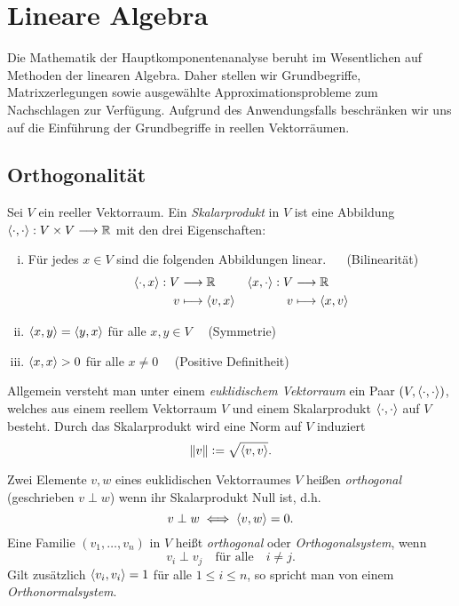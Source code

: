 \chapter{Lineare Algebra}
\label{linear_algebra}

Die Mathematik der Hauptkomponentenanalyse beruht im Wesentlichen auf Methoden der linearen Algebra. Daher stellen wir Grundbegriffe, Matrixzerlegungen sowie ausgewählte Approximationsprobleme zum Nachschlagen zur Verfügung. Aufgrund des Anwendungsfalls beschränken wir uns auf die Einführung der Grundbegriffe in reellen Vektorräumen.

\section{Orthogonalität}
\label{orthogonality}

\begin{defn}
Sei $V$ ein reeller Vektorraum. Ein \textit{Skalarprodukt} in $V$ ist eine Abbildung $\langle \cdot, \cdot \rangle: V \times V \longrightarrow \mathbb{R}$ mit den drei Eigenschaften:
\begin{enumerate}[(i)]
\item Für jedes $x \in V$ sind die folgenden Abbildungen linear. $\quad$ (Bilinearität)
\begin{align*}
\langle \cdot, x \rangle: V & \longrightarrow \mathbb{R} & \langle x, \cdot \rangle: V & \longrightarrow \mathbb{R}\\
v & \longmapsto \langle v, x \rangle & v & \longmapsto \langle x, v \rangle
\end{align*}
\item \vspace{-0.3cm}$\langle x, y \rangle = \langle y, x \rangle$ für alle  $x,y \in V \quad$ (Symmetrie)
\item $\langle x, x \rangle > 0$ für alle $x \neq 0 \quad$ (Positive Definitheit)
\end{enumerate}
\end{defn}

Allgemein versteht man unter einem \textit{euklidischem Vektorraum} ein Paar $(V, \langle \cdot, \cdot \rangle)$, welches aus einem reellem Vektorraum $V$ und einem Skalarprodukt $\langle \cdot, \cdot \rangle$ auf $V$ besteht. Durch das Skalarprodukt wird eine Norm auf $V$ induziert
$$\left\lVert v \right\rVert \vcentcolon= \sqrt{\langle v, v \rangle}.$$

\begin{defn}
Zwei Elemente $v, w$ eines euklidischen Vektorraumes $V$ heißen \textit{orthogonal} (geschrieben $v \perp w$) wenn ihr Skalarprodukt Null ist, d.h.
$$v \perp w \iff \langle v, w \rangle = 0.$$
Eine Familie $(v_1, \ldots, v_n)$ in $V$ heißt \textit{orthogonal} oder \textit{Orthogonalsystem}, wenn
$$v_i \perp v_j \quad \text{für alle} \quad i \neq j.$$
Gilt zusätzlich $\langle v_i, v_i \rangle = 1$ für alle $1 \leq i \leq n$, so spricht man von einem \textit{Orthonormalsystem}.
\end{defn}

